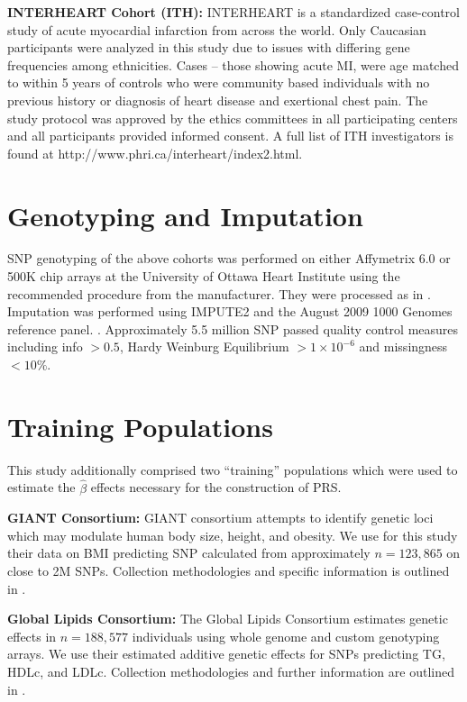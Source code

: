 \textbf{INTERHEART Cohort (ITH):} INTERHEART is a standardized case-control study of acute myocardial infarction from across the world. Only Caucasian participants were analyzed in this study due to issues with differing gene frequencies among ethnicities. Cases -- those showing acute MI, were age matched to within 5 years of controls who were community based individuals with no previous history or diagnosis of heart disease and exertional chest pain. The study protocol was approved by the ethics committees in all participating centers and all participants provided informed consent. A full list of ITH investigators is found at http://www.phri.ca/interheart/index2.html.

\section{Genotyping and Imputation}

SNP genotyping of the above cohorts was performed on either Affymetrix 6.0 or 500K chip arrays at the University of Ottawa Heart Institute using the recommended procedure from the manufacturer. They were processed as in \cite{Dandona2010,Schunkert2011}. Imputation was performed using IMPUTE2 and the August 2009 1000 Genomes reference panel. \citep{10.1371/journal.pgen.1000529}. Approximately 5.5 million \ac{SNP} passed quality control measures including info $> 0.5$, Hardy Weinburg Equilibrium $> 1 \times 10^{-6}$ and missingness $< 10\%$. 


\section{Training Populations}
\label{training}

This study additionally comprised two ``training'' populations which were used to estimate the $\hat{\beta}$ effects necessary for the construction of \ac{PRS}.

\textbf{GIANT Consortium: } \ac{GIANT} consortium attempts to identify genetic loci which may modulate human body size, height, and obesity. We use for this study their data on BMI predicting \ac{SNP} calculated from approximately $n = 123,865$ on close to 2M \acp{SNP}. Collection methodologies and specific information is outlined in \cite{Speliotes2010}.

\textbf{Global Lipids Consortium:} The Global Lipids Consortium estimates genetic effects in $n = 188,577$ individuals using whole genome and custom genotyping arrays. We use their estimated additive genetic effects for SNPs predicting \ac{TG}, \ac{HDLc}, and \ac{LDLc}. Collection methodologies and further information are outlined in \citep{Consortium2013}.

